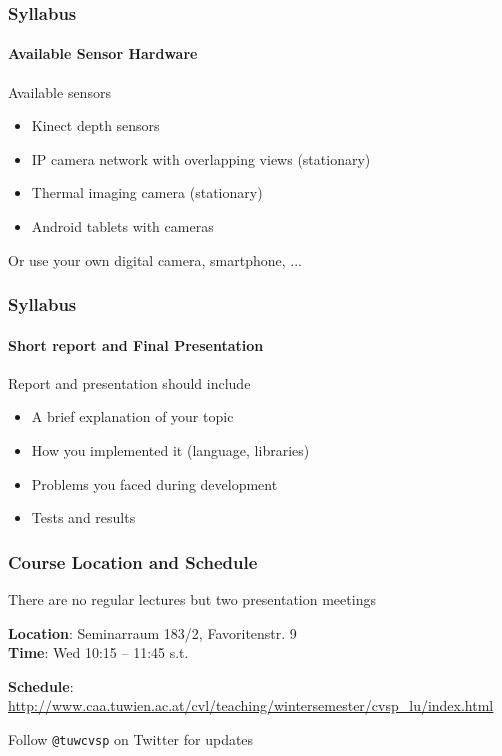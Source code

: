 \documentclass[xetex,professionalfont]{beamer}
\begin{document}

\begin{frame}
\frametitle{Syllabus}
\framesubtitle{Available Sensor Hardware}

Available sensors
\begin{itemize}
	\item Kinect depth sensors
	\item IP camera network with overlapping views (stationary)
	\item Thermal imaging camera (stationary)
	\item Android tablets with cameras
\end{itemize}

\bigskip
Or use your own digital camera, smartphone, ...

\end{frame}


\begin{frame}
\frametitle{Syllabus}
\framesubtitle{Short report and Final Presentation}

Report and presentation should include
\begin{itemize} 
	\item A brief explanation of your topic
	\item How you implemented it (language, libraries)
	\item Problems you faced during development
	\item Tests and results
\end{itemize}

\end{frame}


\begin{frame}
\frametitle{Course Location and Schedule}

There are no regular lectures but two presentation meetings

\bigskip
\textbf{Location}: Seminarraum 183/2, Favoritenstr. 9\\
\textbf{Time}: Wed 10:15 -- 11:45 s.t.

\bigskip
\textbf{Schedule}: \url{http://www.caa.tuwien.ac.at/cvl/teaching/wintersemester/cvsp_lu/index.html}

\bigskip
Follow \texttt{@tuwcvsp} on Twitter for updates

\end{frame}
\end{document}
